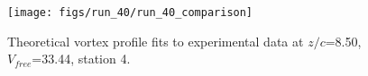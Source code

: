 \begin{figure}[H]
\centering
\texttt{[image: figs/run\_40/run\_40\_comparison]}
\caption{Theoretical vortex profile fits to experimental data at $z/c$=8.50, $V_{free}$=33.44, station 4.}
\label{fig:run_40_comparison}
\end{figure}


